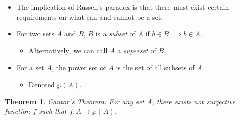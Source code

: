 \documentclass{article}
\newtheorem{theorem}{Theorem}
\begin{document}
\begin{itemize}
	\item The implication of Russell's paradox is that there must exist certain requirements on what can and cannot be a set.
\end{itemize}

\begin{itemize}
	\item For two sets $A$ and $B$, $B$ is a \emph{subset} of $A$ if $b \in B \implies b \in A$.
	\begin{itemize}
		\item Alternatively, we can call $A$ a \emph{superset} of $B$.
	\end{itemize}
	\item For a set $A$, the power set of $A$ is the set of all subsets of $A$.
	\begin{itemize}
		\item Denoted $\wp(A)$.
	\end{itemize}
\end{itemize}

\begin{theorem}
	Cantor's Theorem: For any set $A$, there exists not surjective function $f$ such that $f: A \rightarrow \wp(A)$.
\end{theorem}
\end{document}
